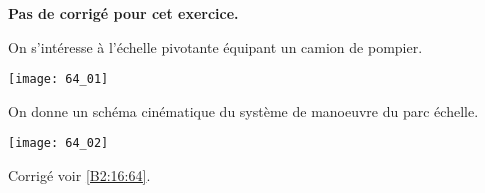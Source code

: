 \normaltrue \difficilefalse \tdifficilefalse
\correctionfalse

\exer{ $\star$ \label{B2:16:64}}
\setcounter{numques}{0}


\ifcorrection
\else
\textbf{Pas de corrigé pour cet exercice.}
\fi

\ifprof
\else
On s'intéresse à l'échelle pivotante équipant un camion de pompier.


\begin{center}
\texttt{[image: 64\_01]}
\end{center}

On donne un schéma cinématique du système de manoeuvre du parc échelle.

\begin{center}
\texttt{[image: 64\_02]}
\end{center}

\fi

\ifprof
\else 
\fi

\ifprof
\else 
\fi

\ifprof
\else 
\fi
 
 

\ifprof
\else

\noindent\footnotesize
\normalsize

\begin{flushright}
\footnotesize{Corrigé  voir \ref{B2:16:64}.}
\end{flushright}%
\fi